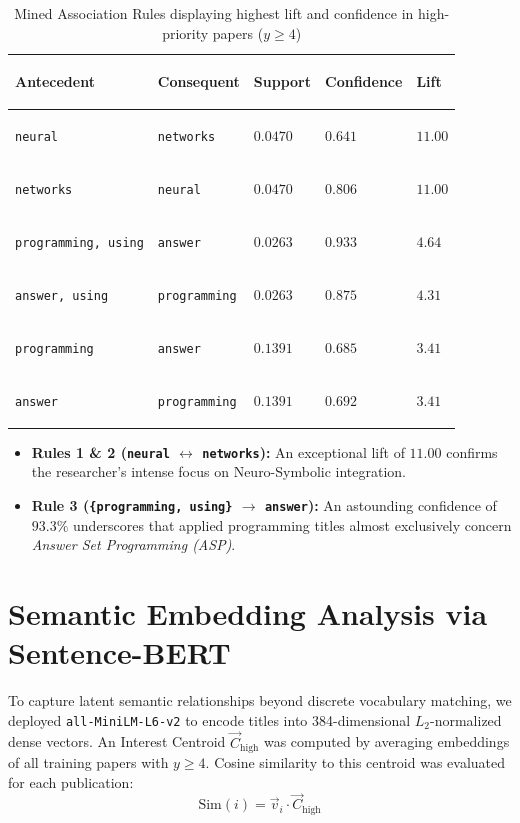 \begin{table}[!htbp]
  \centering
  \small
  \setlength{\tabcolsep}{4.5pt}
  \begin{tabularx}{\linewidth}{>{\bfseries\raggedright\arraybackslash}X >{\raggedright\arraybackslash}p{2.6cm} >{\centering\arraybackslash}p{2.0cm} >{\centering\arraybackslash}p{2.2cm} >{\centering\arraybackslash}p{1.8cm}}
    \toprule
    \rowcolor{PrismHeader}
    \color{PrismWhite}\textbf{Antecedent} & 
    \color{PrismWhite}\textbf{Consequent} & 
    \color{PrismWhite}\textbf{Support} & 
    \color{PrismWhite}\textbf{Confidence} & 
    \color{PrismWhite}\textbf{Lift} \\
    \midrule
    \texttt{neural} & \texttt{networks} & $0.0470$ & $0.641$ & $\mathbf{11.00}$ \\
    \rowcolor{PrismLabel}
    \texttt{networks} & \texttt{neural} & $0.0470$ & $\mathbf{0.806}$ & $\mathbf{11.00}$ \\
    \texttt{programming, using} & \texttt{answer} & $0.0263$ & $\mathbf{0.933}$ & $\mathbf{4.64}$ \\
    \rowcolor{PrismLabel}
    \texttt{answer, using} & \texttt{programming} & $0.0263$ & $0.875$ & $4.31$ \\
    \texttt{programming} & \texttt{answer} & $0.1391$ & $0.685$ & $3.41$ \\
    \rowcolor{PrismLabel}
    \texttt{answer} & \texttt{programming} & $0.1391$ & $0.692$ & $3.41$ \\
    \bottomrule
  \end{tabularx}
  \caption{Mined Association Rules displaying highest lift and confidence in high-priority papers ($y \ge 4$)}
  \label{tab:assoc_rules}
\end{table}

\begin{itemize}
  \item \textbf{Rules 1 \& 2 (\texttt{neural} $\leftrightarrow$ \texttt{networks}):} An exceptional lift of $\mathbf{11.00}$ confirms the researcher's intense focus on Neuro-Symbolic integration.
  \item \textbf{Rule 3 (\texttt{\{programming, using\}} $\to$ \texttt{answer}):} An astounding confidence of $\mathbf{93.3\%}$ underscores that applied programming titles almost exclusively concern \textit{Answer Set Programming (ASP)}.
\end{itemize}

\section{Semantic Embedding Analysis via Sentence-BERT}
To capture latent semantic relationships beyond discrete vocabulary matching, we deployed \texttt{all-MiniLM-L6-v2} \cite{reimers2019sentence} to encode titles into 384-dimensional $L_2$-normalized dense vectors. An Interest Centroid $\vec{C}_{\text{high}}$ was computed by averaging embeddings of all training papers with $y \ge 4$. Cosine similarity to this centroid was evaluated for each publication:
\begin{equation}
  \text{Sim}(i) = \vec{v}_i \cdot \vec{C}_{\text{high}}
\end{equation}


